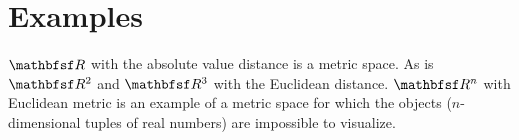 \section*{Examples}

$\R $ with the absolute value distance is a metric space.
As is $\R ^2$ and $\R ^3$ with the Euclidean distance.
$\R ^n$ with Euclidean metric is an example of a metric space for which the objects ($n$-dimensional tuples of real numbers) are impossible to visualize.

